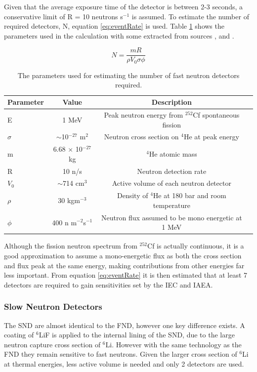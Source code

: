 Given that the average exposure time of the detector is between 2-3 seconds, a conservative limit of R = 10 neutrons s$^{-1}$ is assumed. To estimate the number of required detectors, N, equation \ref{eq:eventRate} is used. Table \ref{tab:neutronCfNumbers} shows the parameters used in the calculation with some extracted from sources \cite{helium4Detectors},\cite{endfLibrary} and \cite{cf252Neutrons}.

\begin{equation}
	N = \frac{mR}{\rho V_{0}\sigma \phi}
	\label{eq:eventRate}
\end{equation}

\begin{table}[!htbp]
	\begin{center}
	\begin{tabular}{l*{2}{c}r}
	\hline
	 \hline
	 Parameter & Value & Description \\
    	\hline
	E & 1 MeV & Peak neutron energy from $^{252}$Cf spontaneous fission \cite{cf252Neutrons} \\
    	$\sigma$ & $\sim$10$^{-27}$ m$^{2}$ & Neutron cross section on $^{4}$He at peak energy \cite{endfLibrary}\\
	m & 6.68 $\times$ 10$^{-27}$ kg & $^{4}$He atomic mass \\
	R & 10 n/s & Neutron detection rate \\
	$V_{0}$ & $\sim$714 cm$^{3}$ & Active volume of each neutron detector \cite{helium4Detectors} \\
	$\rho$ & 30 kgm$^{-3}$ & Density of $^{4}$He at 180 bar and room temperature \\
	$\phi$ & 400 n m$^{-2}$s$^{-1}$ & Neutron flux assumed to be mono energetic at 1 MeV \\
    	\hline
    	\hline
  	\end{tabular}
	\caption{The parameters used for estimating the number of fast neutron detectors required.}
    	\label{tab:neutronCfNumbers}
	\end{center}
\end{table}

Although the fission neutron spectrum from $^{252}$Cf is actually continuous, it is a good approximation to assume a mono-energetic flux as both the cross section and flux peak at the same energy, making contributions from other energies far less important. From equation \ref{eq:eventRate} it is then estimated that at least 7 detectors are required to gain sensitivities set by the IEC and IAEA.

\subsubsection{Slow Neutron Detectors}
The SND are almost identical to the FND, however one key difference exists. A coating of $^{6}$LiF is applied to the internal lining of the SND, due to the large neutron capture cross section of $^{6}$Li. However with the same technology as the FND they remain sensitive to fast neutrons. Given the larger cross section of $^{6}$Li at thermal energies, less active volume is needed and only 2 detectors are used.

